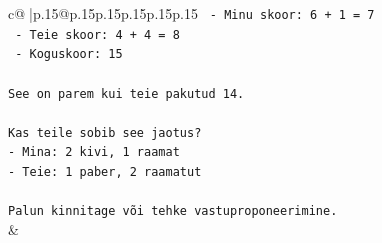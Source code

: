 \documentclass{article}
\begin{document}
{\begin{supertabular}{c@{$\;$}|p{.15\linewidth}@{}p{.15\linewidth}p{.15\linewidth}p{.15\linewidth}p{.15\linewidth}p{.15\linewidth}}
{{{\texttt{  {-} Minu skoor: 6 + 1 = 7} \\
\texttt{  {-} Teie skoor: 4 + 4 = 8} \\
\texttt{  {-} Koguskoor: 15} \\
\\ 
\texttt{See on parem kui teie pakutud 14.} \\
\\ 
\texttt{Kas teile sobib see jaotus?} \\
\texttt{{-} Mina: 2 kivi, 1 raamat} \\
\texttt{{-} Teie: 1 paber, 2 raamatut} \\
\\ 
\texttt{Palun kinnitage või tehke vastuproponeerimine.} \\
            }
        }
    }
    & \\ \\


\end{supertabular}}
\end{document}
